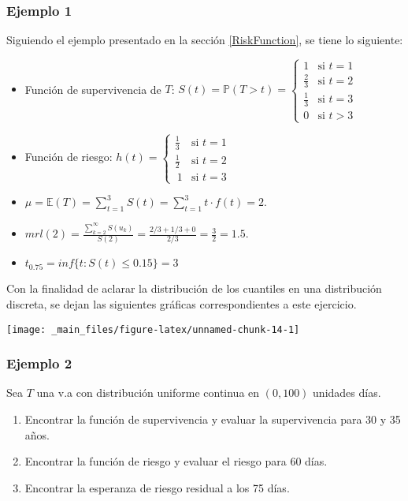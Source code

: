 \documentclass[
  a4paper,
  oneside,
  openany]{book}
\providecommand{\tightlist}{%
  \setlength{\itemsep}{0pt}\setlength{\parskip}{0pt}}
\begin{document}
\hypertarget{ejemplo-1-1}{%
\subsubsection*{Ejemplo 1}\label{ejemplo-1-1}}


Siguiendo el ejemplo presentado en la sección \ref{RiskFunction}, se tiene lo siguiente:

\begin{itemize}
\tightlist
\item
  Función de supervivencia de \(T\): \(S(t) = \mathbb{P}(T>t)=\left\{\begin{array}{ll}1 & \mbox{si }t=1\\\frac{2}{3} & \mbox{si } t=2\\\frac{1}{3} & \mbox{si } t = 3\\0 & \mbox{si }t>3\end{array}\right.\)
\item
  Función de riesgo: \(h(t) =\left\{\begin{array}{ll}\frac{1}{3} & \mbox{si }t=1\\\frac{1}{2} & \mbox{si } t=2\\\ 1 & \mbox{si } t = 3\end{array}\right.\)
\item
  \(\mu = \mathbb{E}(T) = \sum\limits_{t = 1}^3S(t) = \sum\limits_{t = 1}^3t\cdot f(t) = 2\).
\item
  \(mrl(2) = \frac{\sum\limits_{k = 2}^\infty S(u_k)}{S(2)} = \frac{2/3+1/3+0}{2/3} = \frac{3}{2} = 1.5\).
\item
  \(t_{0.75} = inf\{t: S(t) \leq 0.15\} = 3\)
\end{itemize}

Con la finalidad de aclarar la distribución de los cuantiles en una distribución discreta, se dejan las siguientes gráficas correspondientes a este ejercicio.

\begin{center}\texttt{[image: \_main\_files/figure-latex/unnamed-chunk-14-1]} \end{center}

\hypertarget{ejemplo-2-1}{%
\subsubsection*{Ejemplo 2}\label{ejemplo-2-1}}


Sea \(T\) una v.a con distribución uniforme continua en \((0,100)\) unidades días.

\begin{enumerate}
\def\labelenumi{\arabic{enumi}.}
\tightlist
\item
  Encontrar la función de supervivencia y evaluar la supervivencia para 30 y 35 años.
\item
  Encontrar la función de riesgo y evaluar el riesgo para 60 días.
\item
  Encontrar la esperanza de riesgo residual a los 75 días.
\end{enumerate}
\end{document}
